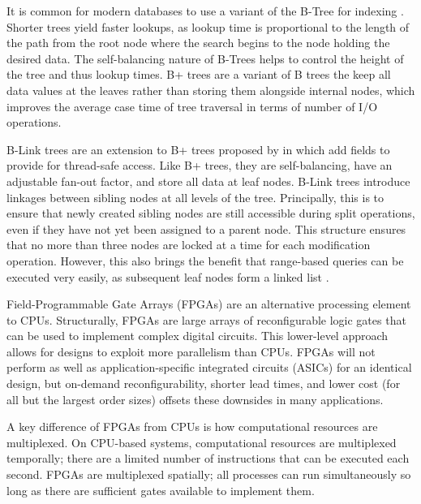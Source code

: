 
\label{sec:indexing}

It is common for modern databases to use a variant of the B-Tree for indexing
\autocite{ma-tpds-2022}. Shorter trees yield faster lookups, as lookup time is
proportional to the length of the path from the root node where the search
begins to the node holding the desired data. The self-balancing nature of
B-Trees helps to control the height of the tree and thus lookup times. B+ trees
are a variant of B trees the keep all data values at the leaves rather than
storing them alongside internal nodes, which improves the average case time of
tree traversal in terms of number of I/O operations.

B-Link trees are an extension to B+ trees proposed by \citeauthor{b-link} in
\citeyear{b-link} which add fields to provide for thread-safe access. Like B+
trees, they are self-balancing, have an adjustable fan-out factor, and store all
data at leaf nodes. B-Link trees introduce linkages between sibling nodes at all
levels of the tree. Principally, this is to ensure that newly created sibling
nodes are still accessible during split operations, even if they have not yet
been assigned to a parent node. This structure ensures that no more than three
nodes are locked at a time for each modification operation. However, this also
brings the benefit that range-based queries can be executed very easily, as
subsequent leaf nodes form a linked list \autocite{b-link}.


\label{sec:fpga}

Field-Programmable Gate Arrays (FPGAs) are an alternative processing element to
CPUs. Structurally, FPGAs are large arrays of reconfigurable logic gates that
can be used to implement complex digital circuits. This lower-level approach
allows for designs to exploit more parallelism than CPUs. FPGAs will not perform
as well as application-specific integrated circuits (ASICs) for an identical
design, but on-demand reconfigurability, shorter lead times, and lower cost (for
all but the largest order sizes) offsets these downsides in many applications.

A key difference of FPGAs from CPUs is how computational resources are
multiplexed. On CPU-based systems, computational resources are multiplexed
temporally; there are a limited number of instructions that can be executed each
second. FPGAs are multiplexed spatially; all processes can run simultaneously so
long as there are sufficient gates available to implement them.

